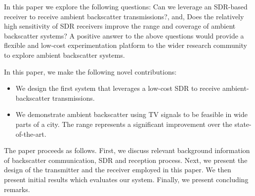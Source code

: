 In this paper we explore the following questions: Can we leverage an
SDR-based receiver to receive ambient backscatter transmissions?, and, Does the  
relatively high sensitivity of SDR receivers improve the
range and coverage of ambient backscatter systems? A positive answer to the above questions would provide a
flexible and low-cost experimentation platform to the wider research community to explore ambient backscatter
systems.

  In this paper, we make the following novel contributions:

\begin{itemize}
		

				\item We design the first system that leverages a  low-cost 
					  SDR to receive ambient-backscatter transmissions. 
				\item  We demonstrate ambient backscatter using TV signals
					   to be feasible in wide parts of a city. The range represents a significant improvement
					   over the state-of-the-art.
				
\end{itemize}

The paper proceeds as follows. First, we discuss relevant background information of backscatter communication,
SDR and reception process. Next, we present the design of the transmitter and the receiver employed in this
paper. We then present initial results which evaluates our system. Finally, we present concluding remarks.
